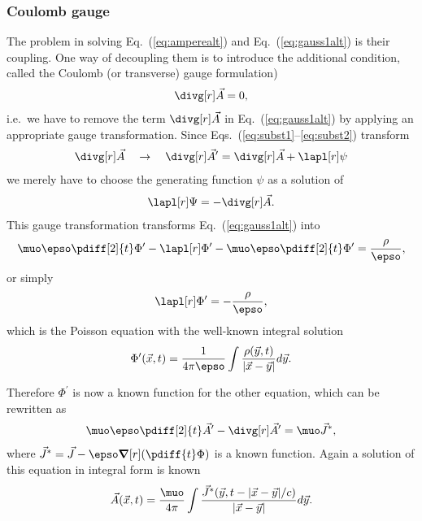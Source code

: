 \documentclass[10pt,a4paper]{article}
\newcommand*{\Eq}[1]{Eq.~(#1)}
\newcommand*{\Eqs}[1]{Eqs.~(#1)}
\begin{document}
\subsubsection{Coulomb gauge}
The problem in solving \Eq{\ref{eq:amperealt}} and \Eq{\ref{eq:gauss1alt}}
is their coupling. One way of decoupling them is to introduce the additional
condition, called the Coulomb (or transverse) gauge formulation)
\begin{align}
\divg[r]\vec{A}=0, \label{eq:coulombgauge}
\end{align}
i.e.\ we have to remove the term $\divg[r]\vec{A}$ in
\Eq{\ref{eq:gauss1alt}} by applying
an appropriate gauge transformation. Since
\Eqs{\ref{eq:subst1}--\ref{eq:subst2}} transform
\begin{align}
\divg[r]\vec{A} \quad \rightarrow \quad
\divg[r]\vec{A}^\prime = \divg[r]\vec{A} + \lapl[r]\psi
\end{align}
we merely have to choose the generating function $\psi$ as a solution of 
\begin{align}
\lapl[r]\Psi = - \divg[r]\vec{A}.\label{eq:psicond}
\end{align}
This gauge transformation transforms \Eq{\ref{eq:gauss1alt}} into 
\begin{align}
\muo\epso\pdiff[2]{t}\Phi^\prime - \lapl[r]\Phi^\prime -
\muo\epso\pdiff[2]{t}\Phi^\prime  = \frac{\rho}{\epso}, 
\end{align}
or simply
\begin{align}
\lapl[r]\Phi^\prime = -\frac{\rho}{\epso}, 
\end{align}
which is the Poisson equation with the well-known integral solution
\begin{align}
\Phi^\prime(\vec{x},t) = \frac{1}{4\pi\epso}
\int\frac{\rho(\vec{y},t)}{|\vec{x}-\vec{y}|} d\vec{y}. 
\end{align}

Therefore $\Phi^\prime$ is now a known function for the other equation, 
which can be rewritten as
\begin{align}
\muo\epso\pdiff[2]{t}\vec{A}^\prime - \divg[r]\vec{A}^\prime =
\muo\vec{J}^\ast, 
\end{align}
where $\vec{J}^\ast = \vec{J}-\epso\grad[r](\pdiff{t}\Phi)$ is a known function.
Again a solution of this equation in integral form is known
\begin{align}
\vec{A}(\vec{x},t) = \frac{\muo}{4\pi} 
\int\frac{\vec{J}^\ast(\vec{y},t-|\vec{x}-\vec{y}|/c)}{|\vec{x}-\vec{y}|}
d\vec{y}.
\end{align}
\end{document}
